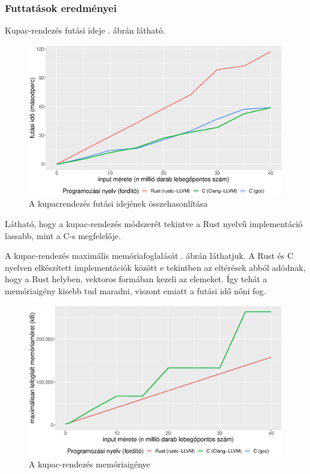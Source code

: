 \subsubsection{Futtatások eredményei}

Kupac-rendezés futási ideje . ábrán látható.

\begin{figure}[h!]
\centering
\includegraphics[width=15.5cm]{kepek/heap_sort_run.eps}
\caption{A kupacrendezés futási idejének összehasonlítása}
\label{fig:heapsort}
\end{figure}

Látható, hogy a kupac-rendezés módszerét tekintve a Rust nyelvű implementáció lassabb, mint a C-s megfelelője.

A kupac-rendezés maximális memóriafoglalását . ábrán láthatjuk. A Rust és C nyelven elkészített implementációk között e tekintben az eltérések abból adódnak, hogy a Rust helyben, vektoros formában kezeli az elemeket. Így tehát a memóriaigény kisebb tud maradni, viszont emiatt a futási idő nőni fog.

\begin{figure}[h!]
\includegraphics[width=15.5cm]{kepek/heap_sort_memory.eps}
\caption{A kupac-rendezés memóriaigénye}
\label{fig:heapsort_mem}
\end{figure}


